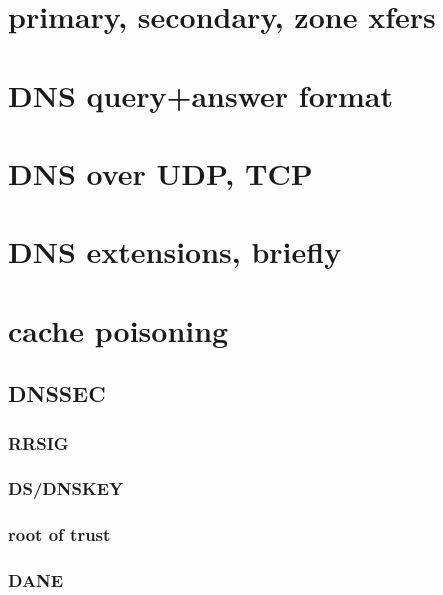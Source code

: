 \section{primary, secondary, zone xfers}

\section{DNS query+answer format}


\section{DNS over UDP, TCP}


\section{DNS extensions, briefly}


\section{cache poisoning}




\subsection{DNSSEC}


\subsubsection{RRSIG}


\subsubsection{DS/DNSKEY}


\subsubsection{root of trust}


\subsubsection{DANE}


